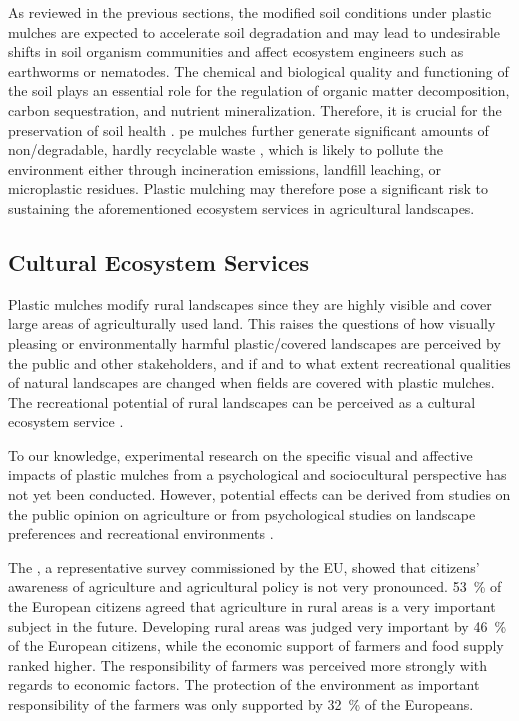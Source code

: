 As reviewed in the previous sections, the modified soil conditions under plastic mulches are expected to accelerate soil degradation and may lead to undesirable shifts in soil organism communities and affect ecosystem engineers such as earthworms or nematodes. The chemical and biological quality and functioning of the soil plays an essential role for the regulation of organic matter decomposition, carbon sequestration, and nutrient mineralization. Therefore, it is crucial for the preservation of soil health \citep{StorkInvertebrates1992}. \ac{pe} mulches further generate significant amounts of non\-/degradable, hardly recyclable waste \citep[see discussion further above and][]{DelgadoTechnological2006}, which is likely to pollute the environment either through incineration emissions, landfill leaching, or microplastic residues. Plastic mulching may therefore pose a significant risk to sustaining the aforementioned ecosystem services in agricultural landscapes.

\subsection{Cultural Ecosystem Services}

Plastic mulches modify rural landscapes since they are highly visible and cover large areas of agriculturally used land. This raises the questions of how visually pleasing or environmentally harmful plastic\-/covered landscapes are perceived by the public and other stakeholders, and if and to what extent recreational qualities of natural landscapes are changed when fields are covered with plastic mulches. The recreational potential of rural landscapes can be perceived as a cultural ecosystem service \citep{UlrichHuman1986}.

To our knowledge, experimental research on the specific visual and affective impacts of plastic mulches from a psychological and sociocultural perspective has not yet been conducted. However, potential effects can be derived from studies on the public opinion on agriculture \citep{SpecialEurobarometer410Europeans2014} or from psychological studies on landscape preferences and recreational environments \citep{StegEnvironmental2012}.

The \citet{SpecialEurobarometer410Europeans2014}, a representative survey commissioned by the EU, showed that citizens' awareness of agriculture and agricultural policy is not very pronounced. \SI{53}{\percent} of the European citizens agreed that agriculture in rural areas is a very important subject in the future. Developing rural areas was judged very important by \SI{46}{\percent} of the European citizens, while the economic support of farmers and food supply ranked higher. The responsibility of farmers was perceived more strongly with regards to economic factors. The protection of the environment as important responsibility of the farmers was only supported by \SI{32}{\percent} of the Europeans.

